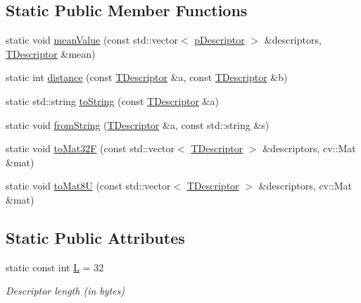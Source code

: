 \subsection*{Static Public Member Functions}
\begin{DoxyCompactItemize}
\item 
static void \mbox{\hyperlink{class_d_bo_w2_1_1_f_o_r_b_a9d78adf3c5c6fe8f2e8668e247acf5cc}{mean\+Value}} (const std\+::vector$<$ \mbox{\hyperlink{class_d_bo_w2_1_1_f_o_r_b_ab52a6568044027cf30c8ac1514fed1a6}{p\+Descriptor}} $>$ \&descriptors, \mbox{\hyperlink{class_d_bo_w2_1_1_f_o_r_b_aef9b966d0293836fab9f55f1799ce0ed}{T\+Descriptor}} \&mean)
\item 
static int \mbox{\hyperlink{class_d_bo_w2_1_1_f_o_r_b_ac166ab6808abc7c385dbaabfacfed38c}{distance}} (const \mbox{\hyperlink{class_d_bo_w2_1_1_f_o_r_b_aef9b966d0293836fab9f55f1799ce0ed}{T\+Descriptor}} \&a, const \mbox{\hyperlink{class_d_bo_w2_1_1_f_o_r_b_aef9b966d0293836fab9f55f1799ce0ed}{T\+Descriptor}} \&b)
\item 
static std\+::string \mbox{\hyperlink{class_d_bo_w2_1_1_f_o_r_b_a3c0ce0fd04ecd52b25b97d253fb922ea}{to\+String}} (const \mbox{\hyperlink{class_d_bo_w2_1_1_f_o_r_b_aef9b966d0293836fab9f55f1799ce0ed}{T\+Descriptor}} \&a)
\item 
static void \mbox{\hyperlink{class_d_bo_w2_1_1_f_o_r_b_a4023e7775d0691b44f6708f865b6b8d7}{from\+String}} (\mbox{\hyperlink{class_d_bo_w2_1_1_f_o_r_b_aef9b966d0293836fab9f55f1799ce0ed}{T\+Descriptor}} \&a, const std\+::string \&s)
\item 
static void \mbox{\hyperlink{class_d_bo_w2_1_1_f_o_r_b_a67b90eaed01dd54e380237c78886635f}{to\+Mat32F}} (const std\+::vector$<$ \mbox{\hyperlink{class_d_bo_w2_1_1_f_o_r_b_aef9b966d0293836fab9f55f1799ce0ed}{T\+Descriptor}} $>$ \&descriptors, cv\+::\+Mat \&mat)
\item 
static void \mbox{\hyperlink{class_d_bo_w2_1_1_f_o_r_b_af0a9e2ea44336f2975a7f3324777330c}{to\+Mat8U}} (const std\+::vector$<$ \mbox{\hyperlink{class_d_bo_w2_1_1_f_o_r_b_aef9b966d0293836fab9f55f1799ce0ed}{T\+Descriptor}} $>$ \&descriptors, cv\+::\+Mat \&mat)
\end{DoxyCompactItemize}
\subsection*{Static Public Attributes}
\begin{DoxyCompactItemize}
\item 
static const int \mbox{\hyperlink{class_d_bo_w2_1_1_f_o_r_b_ad6ed07af4e042effc3c0b169aa5bdd1a}{L}} = 32
\begin{DoxyCompactList}\small\item\em Descriptor length (in bytes) \end{DoxyCompactList}\end{DoxyCompactItemize}


